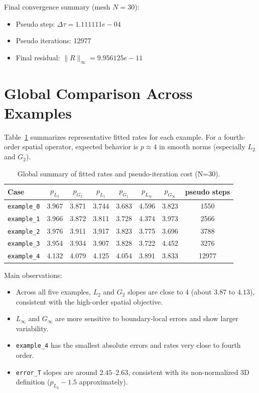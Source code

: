 \documentclass[11pt,a4paper]{article}
\begin{document}
\noindent Final convergence summary (mesh $N=30$):
\begin{itemize}
\item Pseudo step: $\Delta\tau=1.111111e-04$
\item Pseudo iterations: 12977
\item Final residual: $\|R\|_\infty=9.956125e-11$
\end{itemize}
\section{Global Comparison Across Examples}
Table~\ref{tab:global-summary} summarizes representative fitted rates for each example. For a fourth-order spatial operator, expected behavior is $p\approx 4$ in smooth norms (especially $L_2$ and $G_2$).

\begin{table}[htbp]
\centering
\caption{Global summary of fitted rates and pseudo-iteration cost (N=30).}
\label{tab:global-summary}
\small
\begin{tabular}{lccccccc}
\toprule
Case & $p_{L_2}$ & $p_{G_2}$ & $p_{L_1}$ & $p_{G_1}$ & $p_{L_\infty}$ & $p_{G_\infty}$ & pseudo steps \\
\midrule
\texttt{example\_0} & 3.967 & 3.871 & 3.744 & 3.683 & 4.596 & 3.823 & 1550 \\
\texttt{example\_1} & 3.966 & 3.872 & 3.811 & 3.728 & 4.374 & 3.973 & 2566 \\
\texttt{example\_2} & 3.976 & 3.911 & 3.917 & 3.823 & 3.775 & 3.696 & 3788 \\
\texttt{example\_3} & 3.954 & 3.934 & 3.907 & 3.828 & 3.722 & 4.452 & 3276 \\
\texttt{example\_4} & 4.132 & 4.079 & 4.125 & 4.054 & 3.891 & 3.833 & 12977 \\
\bottomrule
\end{tabular}
\end{table}
Main observations:
\begin{itemize}
\item Across all five examples, $L_2$ and $G_2$ slopes are close to 4 (about $3.87$ to $4.13$), consistent with the high-order spatial objective.
\item $L_\infty$ and $G_\infty$ are more sensitive to boundary-local errors and show larger variability.
\item \texttt{example\_4} has the smallest absolute errors and rates very close to fourth order.
\item \texttt{error\_T} slopes are around $2.45$--$2.63$, consistent with its non-normalized 3D definition ($p_{L_2}-1.5$ approximately).
\end{itemize}
\end{document}
